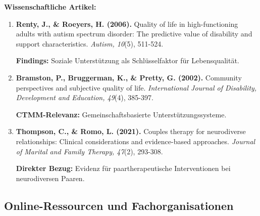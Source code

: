 \begin{ctmmOrangeBox}[title=Peer-Review Studien]

\textbf{Wissenschaftliche Artikel:}
\begin{enumerate}
    \item \textbf{Renty, J., \& Roeyers, H. (2006).} Quality of life in high-functioning adults with autism spectrum disorder: The predictive value of disability and support characteristics. \textit{Autism, 10}(5), 511-524.
    
    \textbf{Findings:} Soziale Unterstützung als Schlüsselfaktor für Lebensqualität.
    
    \item \textbf{Bramston, P., Bruggerman, K., \& Pretty, G. (2002).} Community perspectives and subjective quality of life. \textit{International Journal of Disability, Development and Education, 49}(4), 385-397.
    
    \textbf{CTMM-Relevanz:} Gemeinschaftsbasierte Unterstützungssysteme.
    
    \item \textbf{Thompson, C., \& Romo, L. (2021).} Couples therapy for neurodiverse relationships: Clinical considerations and evidence-based approaches. \textit{Journal of Marital and Family Therapy, 47}(2), 293-308.
    
    \textbf{Direkter Bezug:} Evidenz für paartherapeutische Interventionen bei neurodiversen Paaren.
\end{enumerate}

\end{ctmmOrangeBox}

\subsection{Online-Ressourcen und Fachorganisationen}

